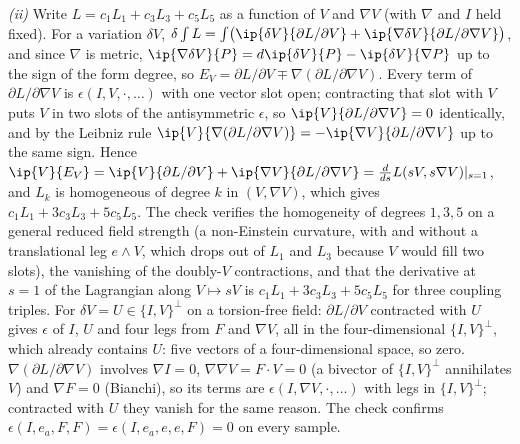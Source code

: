 \emph{(ii)} Write $L = c_{1}L_{1} + c_{3}L_{3} + c_{5}L_{5}$ as a function of $V$ and $\nabla V$ (with $\nabla$ and $I$ held fixed). For a variation $\delta V$, $\delta\int L = \int\bigl(\ip{\delta V}{\partial L/\partial V} + \ip{\nabla\delta V}{\partial L/\partial\nabla V}\bigr)$, and since $\nabla$ is metric, $\ip{\nabla\delta V}{P} = d\ip{\delta V}{P} - \ip{\delta V}{\nabla P}$ up to the sign of the form degree, so $E_{V} = \partial L/\partial V \mp \nabla(\partial L/\partial\nabla V)$. Every term of $\partial L/\partial\nabla V$ is $\epsilon(I, V, \cdot, \ldots)$ with one vector slot open; contracting that slot with $V$ puts $V$ in two slots of the antisymmetric $\epsilon$, so $\ip{V}{\partial L/\partial\nabla V} = 0$ identically, and by the Leibniz rule $\ip{V}{\nabla(\partial L/\partial\nabla V)} = -\ip{\nabla V}{\partial L/\partial\nabla V}$ up to the same sign. Hence $\ip{V}{E_{V}} = \ip{V}{\partial L/\partial V} + \ip{\nabla V}{\partial L/\partial\nabla V} = \tfrac{d}{ds}L(sV, s\nabla V)|_{s=1}$, and $L_{k}$ is homogeneous of degree $k$ in $(V, \nabla V)$, which gives $c_{1}L_{1} + 3c_{3}L_{3} + 5c_{5}L_{5}$. The check verifies the homogeneity of degrees $1, 3, 5$ on a general reduced field strength (a non-Einstein curvature, with and without a translational leg $e\wedge V$, which drops out of $L_{1}$ and $L_{3}$ because $V$ would fill two slots), the vanishing of the doubly-$V$ contractions, and that the derivative at $s = 1$ of the Lagrangian along $V \mapsto sV$ is $c_{1}L_{1} + 3c_{3}L_{3} + 5c_{5}L_{5}$ for three coupling triples. For $\delta V = U \in \{I, V\}^{\perp}$ on a torsion-free field: $\partial L/\partial V$ contracted with $U$ gives $\epsilon$ of $I$, $U$ and four legs from $F$ and $\nabla V$, all in the four-dimensional $\{I, V\}^{\perp}$, which already contains $U$: five vectors of a four-dimensional space, so zero. $\nabla(\partial L/\partial\nabla V)$ involves $\nabla I = 0$, $\nabla\nabla V = F\cdot V = 0$ (a bivector of $\{I,V\}^{\perp}$ annihilates $V$) and $\nabla F = 0$ (Bianchi), so its terms are $\epsilon(I, \nabla V, \cdot, \ldots)$ with legs in $\{I,V\}^{\perp}$; contracted with $U$ they vanish for the same reason. The check confirms $\epsilon(I, e_{a}, F, F) = \epsilon(I, e_{a}, e, e, F) = 0$ on every sample.

